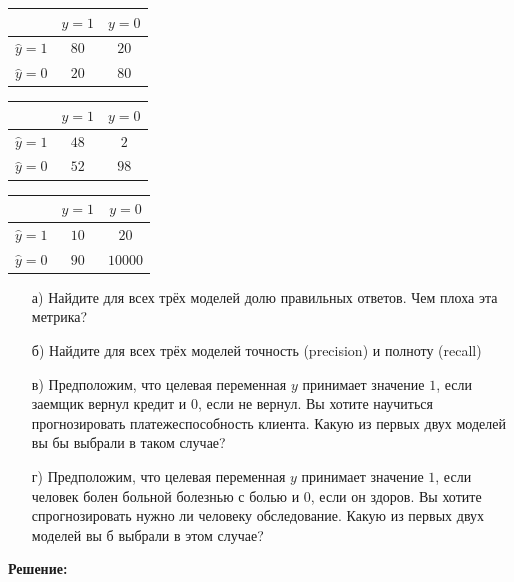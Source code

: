 \documentclass[12pt, a4paper, oneside]{article}
\begin{document}
\begin{minipage}[t]{0.33\textwidth}
	\begin{tabular}{|c|c|c|}
		\hline
		& $y=1$  &  $ y = 0$ \\  \hline 
		$\hat y = 1$  &   $80$ &    $20$ \\      \hline 
		$\hat y = 0$ &   $20$ &     $80$ \\      \hline 
	\end{tabular}
\end{minipage}
\begin{minipage}[t]{0.33\textwidth}
	\begin{tabular}{|c|c|c|}
		\hline
		& $y=1$  &  $ y = 0$ \\  \hline 
		$\hat y = 1$  &   $48$ &    $2$ \\      \hline 
		$\hat y = 0$ &   $52$ &     $98$ \\      \hline 
	\end{tabular}
\end{minipage}
\begin{minipage}[t]{0.33\textwidth}
	\begin{tabular}{|c|c|c|}
		\hline
		& $y=1$  &  $ y = 0$ \\  \hline 
		$\hat y = 1$  &   $10$ &    $20$ \\         \hline 
		$\hat y = 0$ &   $90$ &    $10000$ \\   \hline 
	\end{tabular}
\end{minipage}

\begin{enumerate}
	\item[а)]   Найдите для всех трёх моделей долю правильных ответов. Чем плоха эта метрика? 
	\item[б)]   Найдите для всех трёх моделей точность (precision) и полноту (recall)
	\item[в)]   Предположим, что целевая переменная $y$ принимает значение $1$, если заемщик вернул кредит  и $0$, если не вернул. Вы хотите научиться прогнозировать платежеспособность клиента. Какую из первых двух моделей вы бы выбрали в таком случае? 
	\item[г)]  Предположим, что целевая переменная $y$ принимает значение $1$, если человек болен больной болезнью с болью и $0$, если он здоров. Вы хотите спрогнозировать нужно ли человеку обследование. Какую из первых двух моделей вы б выбрали в этом случае? 
\end{enumerate}


	\textbf{Решение:}
	
\end{document}
